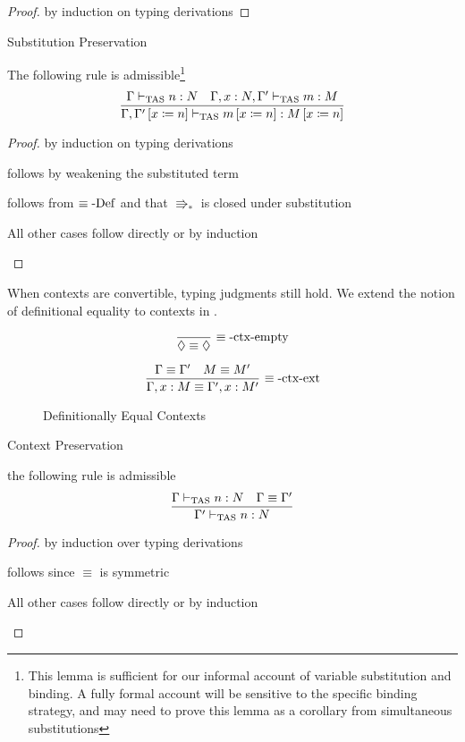 \begin{proof}
by induction on typing derivations
\end{proof}
\begin{lem}
Substitution Preservation

The following rule is admissible\footnote{
  This lemma is sufficient for our informal account of variable substitution and binding.
  A fully formal account will be sensitive to the specific binding strategy, and may need to prove this lemma as a corollary from simultaneous substitutions}
\[
\frac{\Gamma\vdash_{\mathrm{TAS}} n:N\quad\Gamma,x:N,\Gamma'\vdash_{\mathrm{TAS}} m:M}{\Gamma,\Gamma'\left[x\coloneqq n\right]\vdash_{\mathrm{TAS}} m\left[x\coloneqq n\right]:M\left[x\coloneqq n\right]}
\]
\end{lem}

\begin{proof}
by induction on typing derivations

\begin{casenv}
  \item {} follows by weakening the substituted term
  \item {} follows from $\equiv\operatorname{-Def}$ and that $\Rrightarrow_{\ast}$ is closed under substitution
  \item All other cases follow directly or by induction
\end{casenv}
\end{proof}
When contexts are convertible, typing judgments still hold.
We extend the notion of definitional equality to contexts in .

\begin{figure}
\[
\frac{\ }{\lozenge\equiv\lozenge}\,\rulename{\equiv-ctx-empty}
\]

\[
\frac{\Gamma\equiv\Gamma'\quad M\equiv M'}{\Gamma,x:M\equiv\Gamma',x:M'}\,\operatorname{\equiv-ctx-ext}
\]

\caption{Definitionally Equal Contexts}
\label{fig:surface-Context-Equiv}
\end{figure}

\begin{lem}
Context Preservation

the following rule is admissible
\[
\frac{\Gamma\vdash_{\mathrm{TAS}} n:N\quad\Gamma\equiv\Gamma'}{\Gamma'\vdash_{\mathrm{TAS}} n:N}
\]
\end{lem}

\begin{proof}
by induction over typing derivations

\begin{casenv}
  \item {} follows since $\equiv$ is symmetric
  \item All other cases follow directly or by induction
\end{casenv}
\end{proof}


